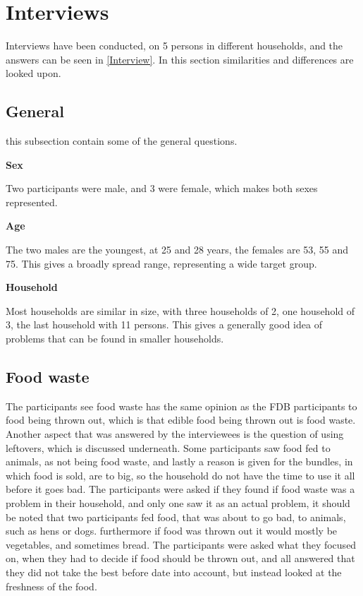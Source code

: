 \section{Interviews}\label{InterviewAnalysis}
Interviews have been conducted, on 5 persons in different households, and the answers can be seen in \cref{Interview}. In this section similarities and differences are looked upon.

\subsection{General}
this subsection contain some of the general questions.

\textbf{Sex}

Two participants were male, and 3 were female, which makes both sexes represented.

\textbf{Age}

The two males are the youngest, at 25 and 28 years, the females are 53, 55 and 75. This gives a broadly spread range, representing a wide target group.

\textbf{Household}

Most households are similar in size, with three households of 2, one household of 3, the last household with 11 persons. This gives a generally good idea of problems that can be found in smaller households.

\subsection{Food waste}
The participants see food waste has the same opinion as the FDB participants to food being thrown out, which is that edible food being thrown out is food waste. Another aspect that was answered by the interviewees is the question of using leftovers, which is discussed underneath. Some participants saw food fed to animals, as not being food waste, and lastly a reason is given for the bundles, in which food is sold, are to big, so the household do not have the time to use it all before it goes bad. The participants were asked if they found if food waste was a problem in their household, and only one saw it as an actual problem, it should be noted that two participants fed food, that was about to go bad,  to animals, such as hens or dogs. furthermore if food was thrown out it would mostly be vegetables, and sometimes bread. The participants were asked what they focused on, when they had to decide if food should be thrown out, and all answered that they did not take the best before date into account, but instead looked at the freshness of the food.

